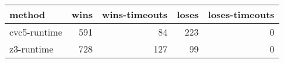 \begin{tabular}{lrrrr}
\hline
 method       &   wins &   wins-timeouts &   loses &   loses-timeouts \\
\hline
 cvc5-runtime &    591 &              84 &     223 &                0 \\
 z3-runtime   &    728 &             127 &      99 &                0 \\
\hline
\end{tabular}
